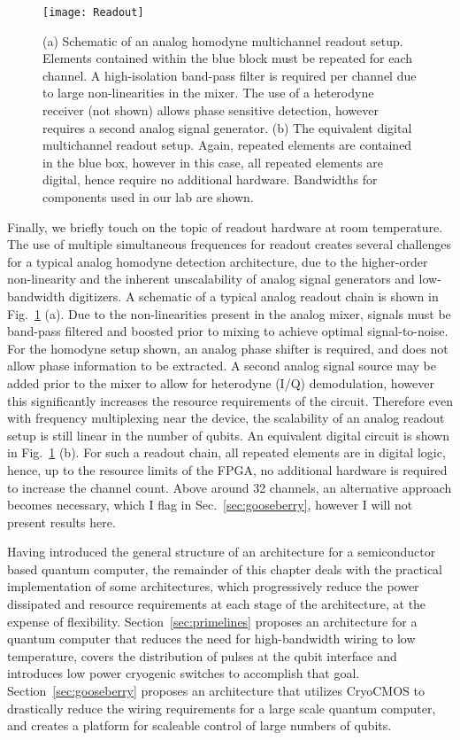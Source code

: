 \begin{figure}
  \texttt{[image: Readout]}
  \caption[Comparison of analog and digital multichannel readout]
  {\label{fig:multiread}(a) Schematic of an analog homodyne multichannel readout setup. Elements contained within the blue block must be repeated for each channel.
  A high-isolation band-pass filter is required per channel due to large non-linearities in the mixer. The use of a heterodyne receiver (not shown) allows phase
  sensitive detection, however requires a second analog signal generator. (b) The equivalent digital multichannel readout setup. Again, repeated elements are contained
  in the blue box, however in this case, all repeated elements are digital, hence require no additional hardware. Bandwidths for components used in our lab are shown.}
\end{figure}

Finally, we briefly touch on the topic of readout hardware at room temperature. The use of multiple simultaneous frequences for readout creates several challenges
for a typical analog homodyne detection architecture, due to the higher-order non-linearity and the inherent unscalability of analog signal generators and low-bandwidth
digitizers. A schematic of a typical analog readout chain is shown in Fig.~\ref{fig:multiread} (a). Due to the non-linearities present in the analog mixer, signals must be
band-pass filtered and boosted prior to mixing to achieve optimal signal-to-noise. For the homodyne setup shown, an analog phase shifter is required, and does not allow
phase information to be extracted. A second analog signal source may be added prior to the mixer to allow for heterodyne (I/Q) demodulation, however this significantly
increases the resource requirements of the circuit. Therefore even with frequency multiplexing near the device, the scalability of an analog readout setup is still
linear in the number of qubits. An equivalent digital circuit is shown in Fig.~\ref{fig:multiread} (b). For such a readout chain, all repeated elements are in digital logic,
hence, up to the resource limits of the FPGA, no additional hardware is required to increase the channel count. Above around 32 channels, an alternative approach becomes
necessary, which I flag in Sec.~\ref{sec:gooseberry}, however I will not present results here.

Having introduced the general structure of an architecture for a semiconductor based quantum computer, the remainder of this chapter deals with the practical implementation
of some architectures, which progressively reduce the power dissipated and resource requirements at each stage of the architecture, at the expense of flexibility.
Section~\ref{sec:primelines} proposes an architecture for a quantum computer that reduces the need for high-bandwidth wiring to low temperature, covers the distribution of pulses
at the qubit interface and introduces low power cryogenic switches to accomplish that goal. Section~\ref{sec:gooseberry} proposes an architecture that utilizes CryoCMOS to drastically
reduce the wiring requirements for a large scale quantum computer, and creates a platform for scaleable control of large numbers of qubits.

